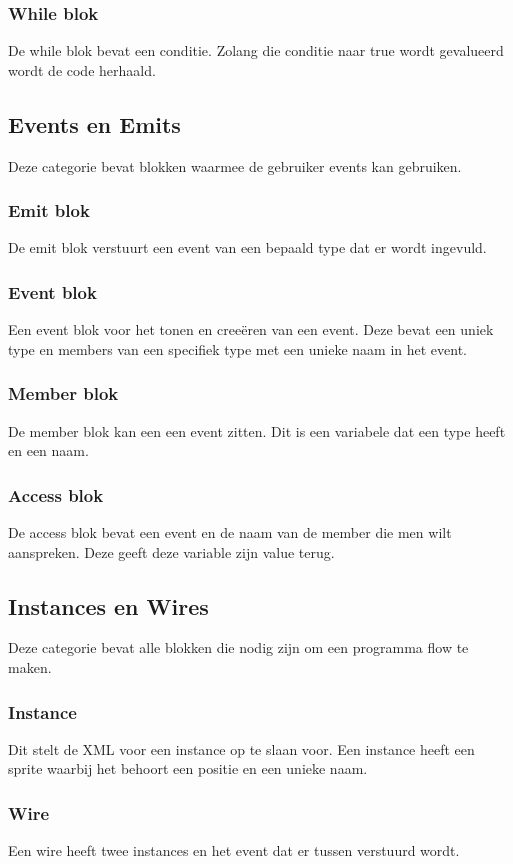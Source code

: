 \documentclass[]{article}
\begin{document}
\subsubsection{While blok}
De while blok bevat een conditie. Zolang die conditie naar true wordt gevalueerd wordt de code herhaald.

\subsection{Events en Emits}
Deze categorie bevat blokken waarmee de gebruiker events kan gebruiken. 
\subsubsection{Emit blok}
De emit blok verstuurt een event van een bepaald type dat er wordt ingevuld. 
\subsubsection{Event blok}
Een event blok voor het tonen en cree\"{e}ren van een event. Deze bevat een uniek type en members van een specifiek type met een unieke naam in het event.
\subsubsection{Member blok}
De member blok kan een een event zitten. Dit is een variabele dat een type heeft en een naam.
\subsubsection{Access blok}
De access blok bevat een event en de naam van de member die men wilt aanspreken.
Deze geeft deze variable zijn value terug.

\subsection{Instances en Wires}
Deze categorie bevat alle blokken die nodig zijn om een programma flow te maken.
\subsubsection{Instance }
Dit stelt de XML voor een instance op te slaan voor. Een instance heeft een sprite waarbij het behoort een positie en een unieke naam.
\subsubsection{Wire}
Een wire heeft twee instances en het event dat er tussen verstuurd wordt.
\end{document}
